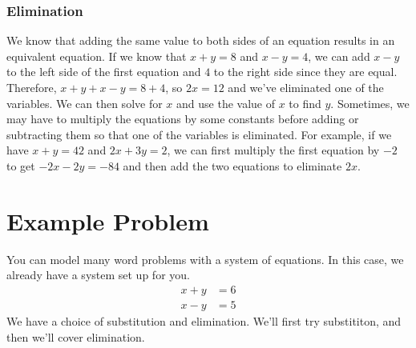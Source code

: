 \documentclass{article}
\begin{document}
    \subsubsection*{Elimination}
    We know that adding the same value to both sides of an equation results in
    an equivalent equation. If we know that $x + y = 8$ and $x - y = 4$, we can
    add $x - y$ to the left side of the first equation and $4$ to the right side
    since they are equal. Therefore, $x + y + x - y = 8 + 4$, so $2x = 12$ and
    we've eliminated one of the variables. We can then solve for $x$ and use the
    value of $x$ to find $y$. Sometimes, we may have to multiply the equations
    by some constants before adding or subtracting them so that one of the
    variables is eliminated. For example, if we have $x + y = 42$ and $2x + 3y =
    2$, we can first multiply the first equation by $-2$ to get $-2x - 2y = -84$
    and then add the two equations to eliminate $2x$.

    \section*{Example Problem}
    You can model many word problems with a system of equations. 
    In this case, we already have a system set up for you.
    \begin{align}
        x + y &= 6 \label{eq1} \\
        x - y &= 5 \label{eq2}
    \end{align}
    We have a choice of substitution and elimination. We'll first try 
    substititon, and then we'll cover elimination.
    
\end{document}
